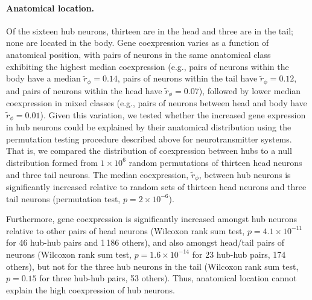 \documentclass[10pt,letterpaper]{article}
\begin{document}
{\paragraph{Anatomical location.}
Of the sixteen hub neurons, thirteen are in the head and three are in the tail; none are located in the body.
Gene coexpression varies as a function of anatomical position, with pairs of neurons in the same anatomical class exhibiting the highest median coexpression (e.g., pairs of neurons within the body have a median $\tilde{r}_\phi = 0.14$, pairs of neurons within the tail have $\tilde{r}_\phi = 0.12$, and pairs of neurons within the head have $\tilde{r}_\phi = 0.07$), followed by lower median coexpression in mixed classes (e.g., pairs of neurons between head and body have $\tilde{r}_\phi = 0.01$).
Given this variation, we tested whether the increased gene expression in hub neurons could be explained by their anatomical distribution using the permutation testing procedure described above for neurotransmitter systems.
That is, we compared the distribution of coexpression between hubs to a null distribution formed from $1 \times 10^6$ random permutations of thirteen head neurons and three tail neurons.
The median coexpression, $\tilde{r}_\phi$, between hub neurons is significantly increased relative to random sets of thirteen head neurons and three tail neurons (permutation test, $p = 2\times 10^{-6}$).

Furthermore, gene coexpression is significantly increased amongst hub neurons relative to other pairs of head neurons (Wilcoxon rank sum test, $p = 4.1 \times 10^{-11}$ for 46 hub-hub pairs and 1\,186 others),
and also amongst head/tail pairs of neurons (Wilcoxon rank sum test, $p = 1.6 \times 10^{-14}$ for 23 hub-hub pairs, 174 others),
but not for the three hub neurons in the tail (Wilcoxon rank sum test, $p = 0.15$ for three hub-hub pairs, 53 others).
Thus, anatomical location cannot explain the high coexpression of hub neurons.

}
\end{document}

